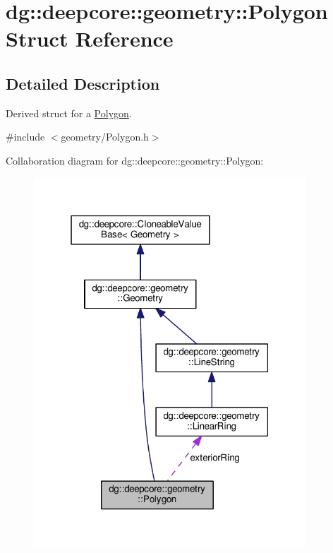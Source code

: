 \hypertarget{structdg_1_1deepcore_1_1geometry_1_1_polygon}{}\section{dg\+:\+:deepcore\+:\+:geometry\+:\+:Polygon Struct Reference}
\label{structdg_1_1deepcore_1_1geometry_1_1_polygon}


\subsection{Detailed Description}
Derived struct for a \hyperlink{structdg_1_1deepcore_1_1geometry_1_1_polygon}{Polygon}. 

{\ttfamily \#include $<$geometry/\+Polygon.\+h$>$}



Collaboration diagram for dg\+:\+:deepcore\+:\+:geometry\+:\+:Polygon\+:
\nopagebreak
\begin{figure}[H]
\begin{center}
\leavevmode
\includegraphics[width=289pt]{structdg_1_1deepcore_1_1geometry_1_1_polygon__coll__graph}
\end{center}
\end{figure}
